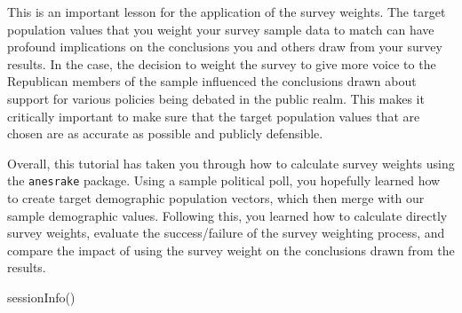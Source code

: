 \documentclass[
  letterpaper,
  DIV=11,
  numbers=noendperiod]{scrreprt}
\newenvironment{Shaded}{\begin{snugshade}}{\end{snugshade}}
\newcommand{\FunctionTok}[1]{\textcolor[rgb]{0.28,0.35,0.67}{#1}}
\newcommand{\NormalTok}[1]{\textcolor[rgb]{0.00,0.23,0.31}{#1}}
\begin{document}
This is an important lesson for the application of the survey weights.
The target population values that you weight your survey sample data to
match can have profound implications on the conclusions you and others
draw from your survey results. In the case, the decision to weight the
survey to give more voice to the Republican members of the sample
influenced the conclusions drawn about support for various policies
being debated in the public realm. This makes it critically important to
make sure that the target population values that are chosen are as
accurate as possible and publicly defensible.

Overall, this tutorial has taken you through how to calculate survey
weights using the \texttt{anesrake} package. Using a sample political
poll, you hopefully learned how to create target demographic population
vectors, which then merge with our sample demographic values. Following
this, you learned how to calculate directly survey weights, evaluate the
success/failure of the survey weighting process, and compare the impact
of using the survey weight on the conclusions drawn from the results.

\begin{Shaded}
\begin{Highlighting}[]
\FunctionTok{sessionInfo}\NormalTok{()}
\end{Highlighting}
\end{Shaded}
\end{document}
